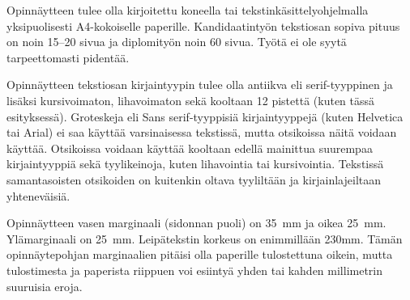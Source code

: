 \documentclass[finnish, 12pt, a4paper, sci, utf8, pdfa]{aaltothesis}
\begin{document}
Opinnäytteen tulee olla kirjoitettu koneella tai
tekstinkäsittelyohjelmalla yksipuolisesti A4-kokoiselle paperille.
Kandidaatintyön tekstiosan sopiva pituus on noin 15--20 sivua ja
diplomityön noin 60 sivua. Työtä ei ole syytä tarpeettomasti pidentää.

Opinnäytteen tekstiosan kirjaintyypin tulee olla antiikva eli
serif\--tyyp\-pi\-nen ja lisäksi kursivoimaton, lihavoimaton sekä kooltaan 12
pistettä (kuten tässä esityksessä). Groteskeja eli \textsf{Sans serif}-tyyppisiä
kirjaintyyppejä (kuten Helvetica tai Arial) ei saa käyttää varsinaisessa
tekstissä, mutta otsikoissa näitä voidaan käyttää.  Otsikoissa voidaan käyttää
kooltaan edellä mainittua suurempaa kirjaintyyppiä sekä tyylikeinoja, kuten
lihavointia tai kursivointia. Tekstissä samantasoisten otsikoiden on kuitenkin
oltava tyyliltään ja kirjainlajeiltaan yhteneväisiä.

\begin{table}[htb]
\caption{Taulukoissa ja kuvissa kirjaintyypin voi valita
tarkoituksenmukaisesti, mutta kuva- ja taulukkoteksteissä tulee
käyttää samaa kirjaintyyppiä kuin varsinaisessa tekstissä. 
Huomaa taulukon numeroinnin sijoittuminen taulukon yläpuolelle. \label{taulukko1}}
\begin{center}
\end{center}
\end{table}

Opinnäytteen vasen marginaali (sidonnan puoli) on
35~mm %
ja oikea 25~mm. Ylämarginaali on 25~mm. Leipätekstin korkeus on
enimmillään 230mm. Tämän opinnäytepohjan marginaalien pitäisi olla
paperille tulostettuna oikein, mutta tulostimesta ja paperista
riippuen voi esiintyä yhden tai kahden millimetrin suuruisia eroja.
\end{document}

